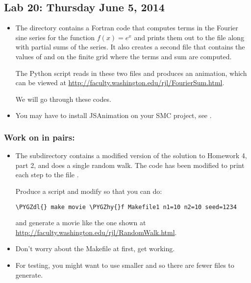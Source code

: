 \documentclass[letterpaper,10pt,english]{sphinxmanual}
\def\PYGZdl{\char`\$}
\def\PYGZhy{\char`\-}
\begin{document}
\subsection{Lab 20: Thursday June 5, 2014}
\label{labs/lab20:lab-20-thursday-june-5-2014}\label{labs/lab20:lab20}\label{labs/lab20::doc}\begin{itemize}
\item {} 
The directory  contains a Fortran code
 that computes terms in the Fourier sine series
for the function \(f(x) = e^x\) and prints them out to the file
 along with partial sums of the series.
It also creates a second file  that contains the values of 
and  on the finite grid where the terms and sum are computed.

The Python script  reads in these two files and produces
an animation, which can be viewed at
\url{http://faculty.washington.edu/rjl/FourierSum.html}.

We will go through these codes.

\item {} 
You may have to install JSAnimation on your SMC project, see
{\hyperref[animation:animation]{}}.

\end{itemize}


\subsubsection{Work on in pairs:}
\label{labs/lab20:work-on-in-pairs}\begin{itemize}
\item {} 
The subdirectory  contains a modified
version of the solution to Homework 4, part 2,  and does a single random
walk.  The  code has been modified to print  each
step to the file .

Produce a script  and modify  so that you can do:

\begin{Verbatim}[commandchars=\\\{\}]
\PYGZdl{} make movie \PYGZhy{}f Makefile1 n1=10 n2=10 seed=1234
\end{Verbatim}

and generate a movie like the one shown at
\url{http://faculty.washington.edu/rjl/RandomWalk.html}.

\item {} 
Don't worry about the Makefile at first, get  working.

\item {} 
For testing, you might want to use smaller  and  so there are
fewer  files to generate.

\end{itemize}
\end{document}
